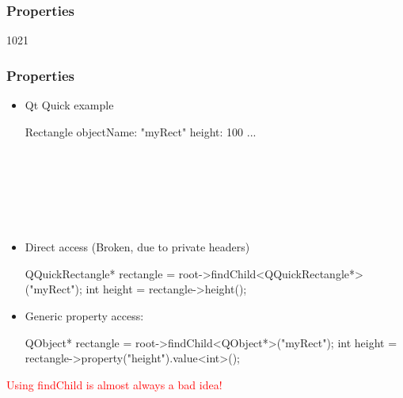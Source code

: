 \subsubsection{Properties}
\begin{slide}[fragile]{1021}
\frametitle{Properties}
\begin{itemize}
\item Qt Quick example\\[2mm]
\begin{EXCLUDE}
Rectangle {
    objectName: "myRect"
    height: 100
    ...
}
\end{EXCLUDE}
\begin{qml}
\\
\\
\\
\\
\qtt{\}}\\
\end{qml}\medskip

\item Direct access (Broken, due to private headers)
  \begin{cpp}
QQuickRectangle* rectangle
  = root->findChild<QQuickRectangle*>("myRect");
int height = rectangle->height();
  \end{cpp}\medskip

\item Generic property access:\\
\begin{cpp}
QObject* rectangle = root->findChild<QObject*>("myRect");
int height = rectangle->property("height").value<int>();
\end{cpp}
\end{itemize}
\hfill\tiny\textcolor{red}{Using findChild is almost always a bad idea!}
\end{slide}

